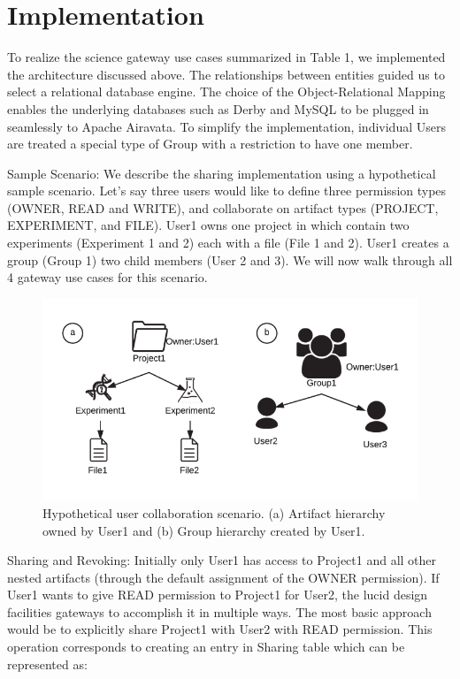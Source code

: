 \documentclass[sigconf]{acmart}
\begin{document}
\section{Implementation}
To realize the science gateway use cases summarized in Table 1, we implemented the architecture discussed above. The relationships between entities guided us to select a relational database engine. The choice of the Object-Relational Mapping enables the underlying databases such as Derby and MySQL to be plugged in seamlessly to Apache Airavata. To simplify the implementation, individual Users are treated a special type of Group with a restriction to have one member. 

Sample Scenario: We describe the sharing implementation using a hypothetical sample scenario. Let's say three users would like to define three permission types (OWNER, READ and WRITE), and collaborate on artifact types (PROJECT, EXPERIMENT, and FILE). User1 owns one project  in which contain two experiments (Experiment 1 and 2) each with a file (File 1 and 2). User1 creates a group (Group 1) two child members (User 2 and 3). We will now walk through all 4 gateway use cases for this scenario.

\begin{figure}
\includegraphics[width=\columnwidth]{figures/usage-scenarios.pdf}
\caption{Hypothetical user collaboration scenario. (a) Artifact hierarchy owned by User1 and (b) Group hierarchy created by User1.}
\end{figure}

Sharing and Revoking: Initially only User1 has access to Project1 and all other nested artifacts (through the default assignment of the OWNER permission). If User1 wants to give READ permission to Project1 for User2, the lucid design facilities gateways to accomplish it in multiple ways. The most basic approach would be to explicitly share Project1 with User2 with READ permission. This operation corresponds to creating an entry in Sharing table which can be represented as: 
\end{document}
